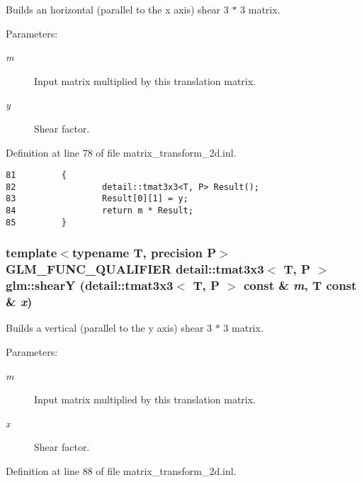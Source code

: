 Builds an horizontal (parallel to the x axis) shear 3 $\ast$ 3 matrix.

\begin{Desc}
\item[Parameters:]
\begin{description}
\item[{\em m}]Input matrix multiplied by this translation matrix. \item[{\em y}]Shear factor. \end{description}
\end{Desc}


Definition at line 78 of file matrix\_\-transform\_\-2d.inl.

\begin{Code}\begin{verbatim}81         {
82                 detail::tmat3x3<T, P> Result();
83                 Result[0][1] = y;
84                 return m * Result;
85         }
\end{verbatim}
\end{Code}


\hypertarget{group__gtx__matrix__transform__2d_g5f6d0ef99f6be6ff1151ca174261004d}{
\subsubsection[shearY]{\setlength{\rightskip}{0pt plus 5cm}template$<$typename T, precision P$>$ GLM\_\-FUNC\_\-QUALIFIER detail::tmat3x3$<$ T, P $>$ glm::shearY (detail::tmat3x3$<$ T, P $>$ const \& {\em m}, \/  T const \& {\em x})}}
\label{group__gtx__matrix__transform__2d_g5f6d0ef99f6be6ff1151ca174261004d}


Builds a vertical (parallel to the y axis) shear 3 $\ast$ 3 matrix.

\begin{Desc}
\item[Parameters:]
\begin{description}
\item[{\em m}]Input matrix multiplied by this translation matrix. \item[{\em x}]Shear factor. \end{description}
\end{Desc}


Definition at line 88 of file matrix\_\-transform\_\-2d.inl.

